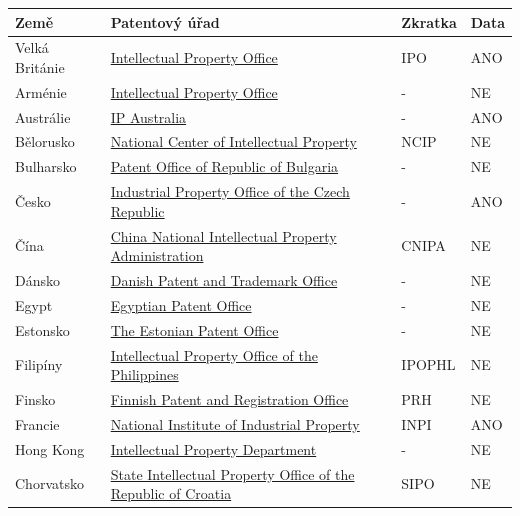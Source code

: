 	\begin{table}[H]
	\centering
	\begin{tabular}{|>{\centering\arraybackslash}p{2.2cm}|>{\centering\arraybackslash}p{7.5cm}|>{\centering\arraybackslash}p{2cm}|>{\centering\arraybackslash}p{1cm}|} 
	\hline
	\textbf{Země}    & \textbf{Patentový úřad} & \textbf{Zkratka} & \textbf{Data}                \\ 
	\hline
	Velká Británie & \href{https://www.gov.uk/topic/intellectual-property}{Intellectual Property Office}  & IPO & ANO        \\ 
	\hline
	Arménie & \href{https://www.aipa.am/hy/}{Intellectual Property Office}  & - & NE        \\ 
	\hline
	Austrálie & \href{https://www.ipaustralia.gov.au/}{IP Australia}  & - & ANO         \\ 
	\hline
	Bělorusko & \href{https://www.ncip.by/}{National Center of Intellectual Property}  & NCIP & NE         \\ 
	\hline
	Bulharsko & \href{https://www.bpo.bg/}{Patent Office of Republic of Bulgaria}  & -  & NE       \\ 
	\hline
	Česko & \href{https://upv.gov.cz/}{Industrial Property Office of the Czech Republic}  & -   & ANO      \\ 
	\hline
	Čína & \href{https://www.cnipa.gov.cn/}{China National Intellectual Property Administration}  & CNIPA   & NE      \\ 
	\hline
	Dánsko & \href{https://www.dkpto.org/}{Danish Patent and Trademark Office}  & -    & NE     \\ 
	\hline
	Egypt & \href{http://www.egypo.gov.eg}{Egyptian Patent Office}  & -   & NE      \\ 
	\hline
	Estonsko & \href{https://www.epa.ee/et}{The Estonian Patent Office}  & -   & NE      \\ 
	\hline
	Filipíny & \href{http://www.ipophil.gov.ph/}{Intellectual Property Office of the Philippines}  & IPOPHL & NE        \\ 
	\hline
	Finsko & \href{http://www.prh.fi/en/index.html}{Finnish Patent and Registration Office}  & PRH   & NE      \\ 
	\hline
	Francie & \href{http://www.inpi.fr/}{National Institute of Industrial Property}  & INPI   & ANO      \\ 
	\hline
	Hong Kong & \href{https://www.ipd.gov.hk/index.htm}{Intellectual Property Department}  & -   & NE      \\ 
	\hline
	Chorvatsko & \href{https://www.dziv.hr/}{State Intellectual Property Office of the Republic of Croatia}  & SIPO  & NE       \\ 

\end{tabular}
\end{table}
